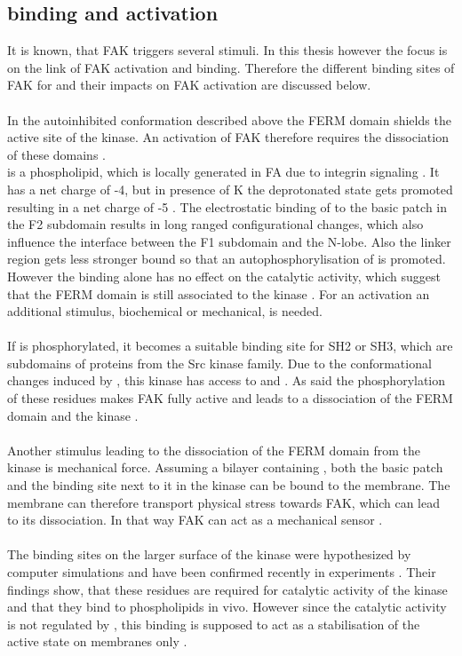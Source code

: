 \subsection{\pip{} binding and activation}
It is known, that FAK triggers several stimuli. In this thesis however the focus is on the link of FAK activation and \pip{} binding. Therefore the different binding sites of FAK for \pip{} and their impacts on FAK activation are discussed below.\\
\\In the autoinhibited conformation described above the FERM domain shields the active site of the kinase. An activation of FAK therefore requires the dissociation of these domains \autocite{structFAK}.\\
\pip{} is a phospholipid, which is locally generated in FA due to integrin signaling \autocite{CITATION34}. It has a net charge of -4, but in presence of K the deprotonated state gets promoted resulting in a net charge of -5 \autocite{pip2_minus5}. The electrostatic binding of \pip{} to the basic patch in the F2 subdomain results in long ranged configurational changes, which also influence the interface between the F1 subdomain and the N-lobe. Also the linker region gets less stronger bound so that an autophosphorylisation of  is promoted. However the \pip{} binding alone has no effect on the catalytic activity, which suggest that the FERM domain is still associated to the kinase \autocites{pap001}{pap003}. For an activation an additional stimulus, biochemical or mechanical, is needed.\\
\\
If  is phosphorylated, it becomes a suitable binding site for SH2 or SH3, which are subdomains of proteins from the Src kinase family. Due to the conformational changes induced by \pip{}, this kinase has access to  and . As said the phosphorylation of these residues makes FAK fully active and leads to a dissociation of the FERM domain and the kinase \autocite{pap001}.\\
\\
Another stimulus leading to the dissociation of the FERM domain from the kinase is mechanical force. Assuming a bilayer containing \pip{}, both the basic patch and the \pip{} binding site next to it in the kinase can be bound to the membrane. The membrane can therefore transport physical stress towards FAK, which can lead to its dissociation. In that way FAK can act as a mechanical sensor \autocite{pap004}.\\
\\
The binding sites on the larger surface of the kinase were hypothesized by computer simulations \autocite{pap002} and have been confirmed recently in experiments \autocite{pap002Exp}. Their findings show, that these residues are required for catalytic activity of the kinase and that they bind to phospholipids in vivo. However since the catalytic activity is not regulated by \pip{}, this binding is supposed to act as a stabilisation of the active state on membranes only \autocite{pap002Exp}.
